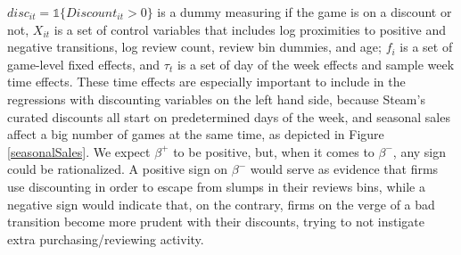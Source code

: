 \documentclass[12pt,pagebackref]{article}
\begin{document}
\noindent \(disc_{it} = \mathds{1}\{Discount_{it} > 0\}\) is a dummy
measuring if the game is on a discount or not, \(X_{it}\) is a set of
control variables that includes log proximities to positive and negative
transitions, log review count, review bin dummies, and age; \(f_i\) is a
set of game-level fixed effects, and \(\tau_t\) is a set of day of the
week effects and sample week time effects. These time effects are
especially important to include in the regressions with discounting
variables on the left hand side, because Steam's curated discounts all
start on predetermined days of the week, and seasonal sales affect a big
number of games at the same time, as depicted in Figure
\ref{seasonalSales}. We expect \(\beta^+\) to be positive, but, when it
comes to \(\beta^-\), any sign could be rationalized. A positive sign on
\(\beta^-\) would serve as evidence that firms use discounting in order
to escape from slumps in their reviews bins, while a negative sign would
indicate that, on the contrary, firms on the verge of a bad transition
become more prudent with their discounts, trying to not instigate extra
purchasing/reviewing activity.
\end{document}
